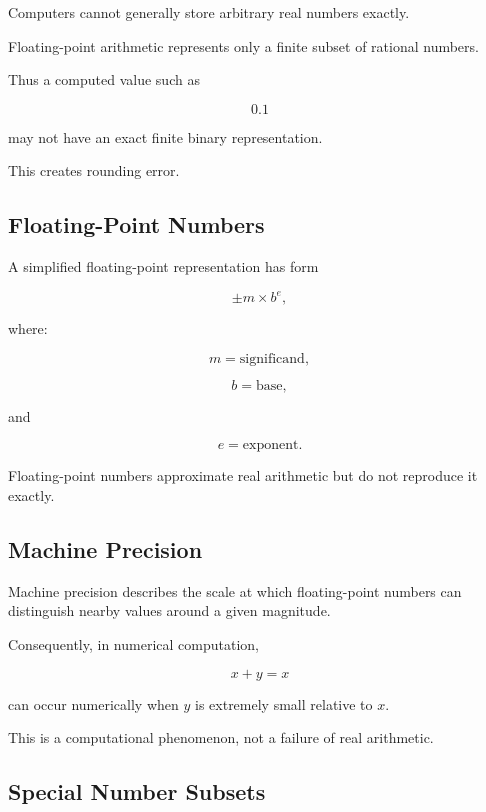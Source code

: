 Computers cannot generally store arbitrary real numbers exactly.

Floating-point arithmetic represents only a finite subset of rational numbers.

Thus a computed value such as

\[
\boxed{
0.1
}
\]

may not have an exact finite binary representation.

This creates rounding error.

\subsection{Floating-Point Numbers}
\label{subsec:floating-point-reference}

A simplified floating-point representation has form

\[
\boxed{
\pm m\times b^e,
}
\]

where:

\[
m
=
\text{significand},
\]

\[
b
=
\text{base},
\]

and

\[
e
=
\text{exponent}.
\]

Floating-point numbers approximate real arithmetic but do not reproduce it
exactly.

\subsection{Machine Precision}
\label{subsec:machine-precision-reference}

Machine precision describes the scale at which floating-point numbers can
distinguish nearby values around a given magnitude.

Consequently, in numerical computation,

\[
\boxed{
x+y=x
}
\]

can occur numerically when \(y\) is extremely small relative to \(x\).

This is a computational phenomenon, not a failure of real arithmetic.

\subsection{Special Number Subsets}
\label{subsec:special-number-subsets}

